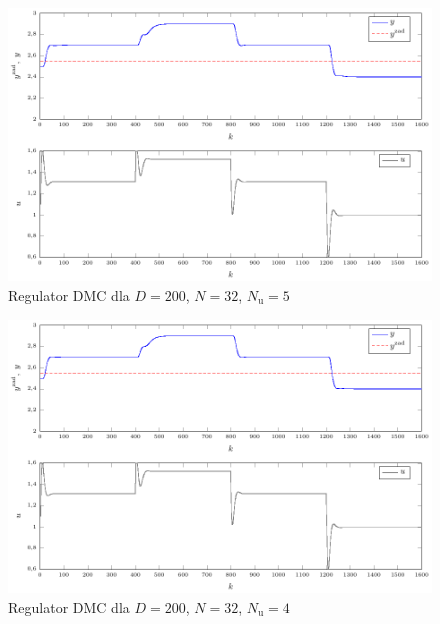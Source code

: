 \begin{figure}[tb] 
\centering 
\includegraphics[scale=1]{rysunki/zapisz_pdf/DMC_D=200.000_N=32.00_Nu=5.00.pdf} 
\caption{Regulator DMC dla $D=200$, $N=32$, $N_{\mathrm{u}}=5$} 
\label{r_pgfplots_DMC_D=200.000_N=32.00_Nu=5.00} 
\end{figure}

\begin{figure}[tb] 
\centering 
\includegraphics[scale=1]{rysunki/zapisz_pdf/DMC_D=200.000_N=32.00_Nu=4.00.pdf} 
\caption{Regulator DMC dla $D=200$, $N=32$, $N_{\mathrm{u}}=4$} 
\label{r_pgfplots_DMC_D=200.000_N=32.00_Nu=4.00} 
\end{figure}

